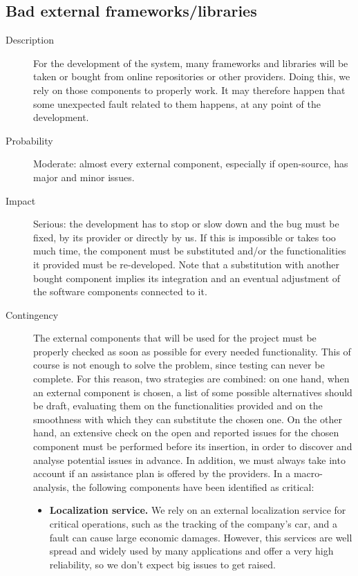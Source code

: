\subsection*{Bad external frameworks/libraries}
	\begin{description}
		\item[Description] For the development of the system, many frameworks and libraries will be taken or bought from online repositories or other providers. Doing this, we rely on those components to properly work. It may therefore happen that some unexpected fault related to them happens, at any point of the development.
		\item[Probability] Moderate: almost every external component, especially if open-source, has major and minor issues.
		\item[Impact] Serious: the development has to stop or slow down and the bug must be fixed, by its provider or directly by us. If this is impossible or takes too much time, the component must be substituted and/or the functionalities it provided must be re-developed. Note that a substitution with another bought component implies its integration and an eventual adjustment of the software components connected to it.
		\item[Contingency] The external components that will be used for the project must be properly checked as soon as possible for every needed functionality. This of course is not enough to solve the problem, since testing can never be complete. For this reason, two strategies are combined: on one hand, when an external component is chosen, a list of some possible alternatives should be draft, evaluating them on the functionalities provided and on the smoothness with which they can substitute the chosen one. On the other hand, an extensive check on the open and reported issues for the chosen component must be performed before its insertion, in order to discover and analyse potential issues in advance. In addition, we must always take into account if an assistance plan is offered by the providers.\newline
		In a macro-analysis, the following components have been identified as critical:
			\begin{itemize}
				\item \textbf{Localization service.} We rely on an external localization service for critical operations, such as the tracking of the company's car, and a fault can cause large economic damages. However, this services are well spread and widely used by many applications and offer a very high reliability, so we don't expect big issues to get raised.

\end{itemize}
\end{description}
